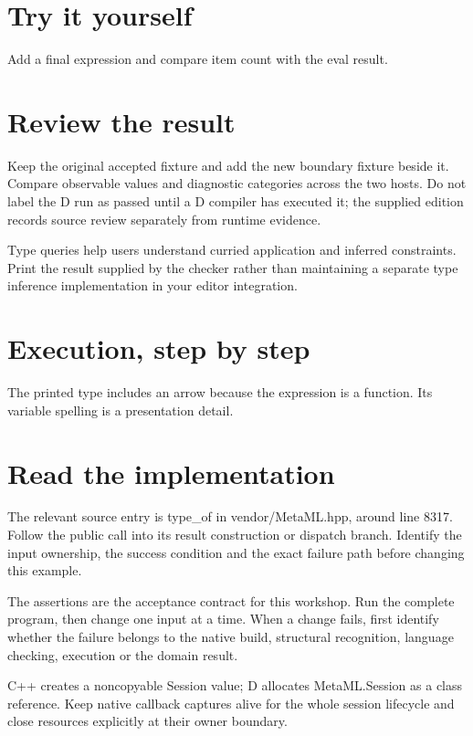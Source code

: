 \section*{Try it yourself}
Add a final expression and compare item count with the eval result.

\section*{Review the result}
Keep the original accepted fixture and add the new boundary fixture beside it. Compare observable values and diagnostic categories across the two hosts. Do not label the D run as passed until a D compiler has executed it; the supplied edition records source review separately from runtime evidence.

\clearpage
{}
Type queries help users understand curried application and inferred constraints. Print the result supplied by the checker rather than maintaining a separate type inference implementation in your editor integration.


\section*{Execution, step by step}
The printed type includes an arrow because the expression is a function. Its variable spelling is a presentation detail.

\section*{Read the implementation}
The relevant source entry is type\_of in vendor/MetaML.hpp, around line 8317. Follow the public call into its result construction or dispatch branch. Identify the input ownership, the success condition and the exact failure path before changing this example.

The assertions are the acceptance contract for this workshop. Run the complete program, then change one input at a time. When a change fails, first identify whether the failure belongs to the native build, structural recognition, language checking, execution or the domain result.

\clearpage
{}
C++ creates a noncopyable Session value; D allocates MetaML.Session as a class reference. Keep native callback captures alive for the whole session lifecycle and close resources explicitly at their owner boundary.


